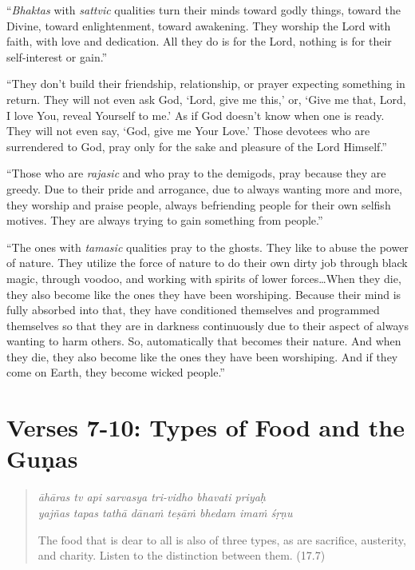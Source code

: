 \documentclass[12pt, twoside, openright]{memoir}
\begin{document}
\enquote{\textit{Bhaktas} with \textit{sattvic} qualities turn their minds toward godly things, toward the Divine, toward enlightenment, toward awakening. They worship the Lord with faith, with love and dedication. All they do is for the Lord, nothing is for their self-interest or gain.}

\enquote{They don’t build their friendship, relationship, or prayer expecting something in return. They will not even ask God, \enquote{Lord, give me this,} or, \enquote{Give me that, Lord, I love You, reveal Yourself to me.} As if God doesn’t know when one is ready. They will not even say, \enquote{God, give me Your Love.} Those devotees who are surrendered to God, pray only for the sake and pleasure of the Lord Himself.}

\enquote{Those who are \textit{rajasic} and who pray to the demigods, pray because they are greedy. Due to their pride and arrogance, due to always wanting more and more, they worship and praise people, always befriending people for their own selfish motives. They are always trying to gain something from people.}

\enquote{The ones with \textit{tamasic} qualities pray to the ghosts. They like to abuse the power of nature. They utilize the force of nature to do their own dirty job through black magic, through voodoo, and working with spirits of lower forces\ldots When they die, they also become like the ones they have been worshiping. Because their mind is fully absorbed into that, they have conditioned themselves and programmed themselves so that they are in darkness continuously due to their aspect of always wanting to harm others. So, automatically that becomes their nature. And when they die, they also become like the ones they have been worshiping. And if they come on Earth, they become wicked people.}

\section{Verses 7-10: Types of Food and the Guṇas}\label{sec-verses-7-10-types-of-food-and-the-gunas}


\par
\begin{verse}
\textit{āhāras tv api sarvasya tri-vidho bhavati priyaḥ} \\
\textit{yajñas tapas tathā dānaṁ teṣāṁ bhedam imaṁ śṛṇu}

\noindent The food that is dear to all is also of three types, as are sacrifice, austerity, and charity. Listen to the distinction between them. (17.7)
\end{verse}
\par
\end{document}
